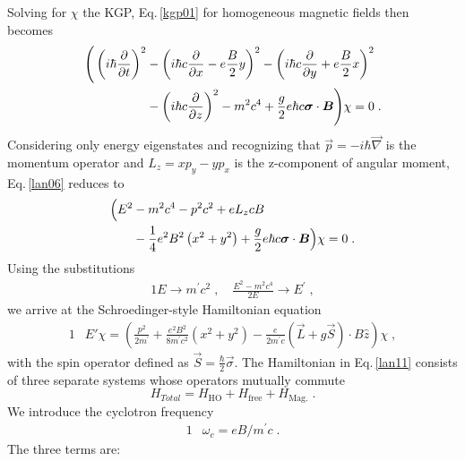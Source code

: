 \documentclass[epj]{svjour}
\begin{document}
Solving for $\chi$ the KGP, Eq.\,\eqref{kgp01} for homogeneous magnetic fields then becomes
\begin{alignat}{1}
\label{lan06} \Bigg(\left(i\hbar\frac{\partial}{\partial t}\right)^{2}&-\left(i\hbar c\frac{\partial}{\partial x}-e\frac{B}{2}y\right)^{2}-\left(i\hbar c\frac{\partial}{\partial y}+e\frac{B}{2}x\right)^{2}\\ 
\notag &-\left(i\hbar c\frac{\partial}{\partial z}\right)^{2}-m^{2}c^{4}+\frac{g}{2}e\hbar c\vec{\sigma}\cdot\vec{B}\Bigg)\chi=0\;.
\end{alignat}
Considering only energy eigenstates and recognizing that $\vec{p}=-i\hbar\vec{\nabla}$ is the momentum operator and $L_{z}=xp_{y}-yp_{x}$ is the z-component of angular moment, Eq.\,\eqref{lan06} reduces to
\begin{alignat}{1}
\label{lan09} \Big(E^{2}&-m^{2}c^{4}-p^{2}c^{2}+eL_{z}cB\\ \notag &-\frac{1}{4}e^{2}B^{2}\left(x^{2}+y^{2}\right)+\frac{g}{2}e\hbar c\vec{\sigma}\cdot\vec{B}\Big)\chi=0\;.
\end{alignat} 
Using the substitutions 
\begin{alignat}{1}
\label{lan10} E\to m^\prime c^{2}\;,\quad \frac{E^{2}-m^{2}c^{4}}{2E}\to E^\prime\;,
\end{alignat} 
we arrive at the Schroedinger-style Hamiltonian equation
\begin{alignat}{1}
\label{lan11} &E'\chi=\left(\!\frac{p^{2}}{2m^\prime }\!+\!\frac{e^{2}B^{2}}{8m^\prime c^{2}}\left(x^{2}\!+\!y^{2}\right)\!-\!\frac{e}{2m^\prime c}\!\left(\vec{L}+g\vec{S}\right)\!\cdot\! B\hat{z}\!\right)\chi\;,
\end{alignat} 
with the spin operator defined as $\vec{S}=\frac{\hbar}{2}\vec{\sigma}$. 
The Hamiltonian in Eq.\,\eqref{lan11} consists of three separate systems whose operators mutually commute 
\begin{equation}
\label{lan36} H_{Total} =H_\mathrm{HO}+H_\mathrm{free}+H_\mathrm{Mag.}\;.
\end{equation}
We introduce the cyclotron frequency
\begin{alignat}{1}
\label{lan30} &\omega_{c}=eB/m^\prime c\;.
\end{alignat} 
The three terms are:
\end{document}
